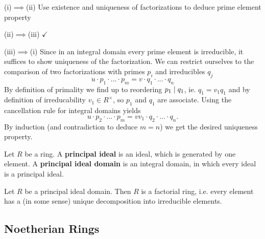	\begin{sketch}
		(i)$\implies$(ii) Use existence and uniqueness of factorizations to deduce prime element property

		(ii)$\implies$(iii) $\checkmark$

		(iii)$\implies$(i) Since in an integral domain every prime element is irreducible, it suffices to show uniqueness of the factorization. We can restrict ourselves to the comparison of two factorizations with primes $p_i$ and irreducibles $q_j$
		\begin{equation*}
			u\cdot p_1\cdot ...\cdot p_m = v \cdot q_1 \cdot ... \cdot q_n
		\end{equation*}
		By definition of primality we find up to reordering $p_1 \mid q_1$, ie. $q_1 = v_1q_1$ and by definition of irreducability $v_1 \in R^\times$, so $p_1$ and $q_1$ are associate. Using the cancellation rule for integral domains yields
		\begin{equation*}
			u\cdot p_2\cdot ...\cdot p_m = vv_1 \cdot q_2 \cdot ... \cdot q_n.
		\end{equation*}
		By induction (and contradiction to deduce $m=n$) we get the desired uniqueness property.
	\end{sketch}

	\begin{lemma}

	\end{lemma}

	\begin{definition}
		Let $R$ be a ring. A \textbf{principal ideal} is an ideal, which is generated by one element. A \textbf{principal ideal domain} is an integral domain, in which every ideal is a principal ideal.
	\end{definition}


	\begin{theorem}
		Let $R$ be a principal ideal domain. Then $R$ is a factorial ring, i.e. every element has a (in some sense) unique decomposition into irreducible elements.
	\end{theorem}

	\newpage
	\subsection{Noetherian Rings}

